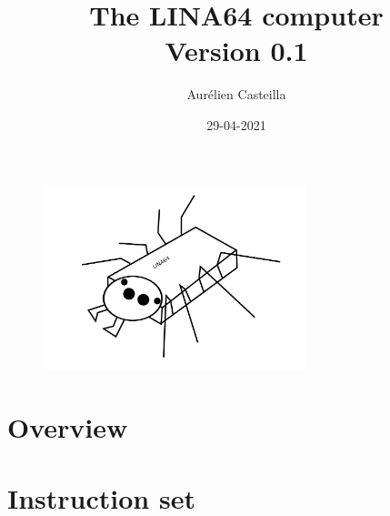 \documentclass[11pt]{book}
\author{Aurélien Casteilla}
\title{The LINA64 computer \\[1ex] \large Version 0.1}
\date{29-04-2021}
\begin{document}
\maketitle
\begin{figure}[h!]
    \includegraphics[width=3in]{mascotte.png}
\end{figure}
\newpage

\tableofcontents

\chapter{Overview}



\chapter{Instruction set}


\end{document}
